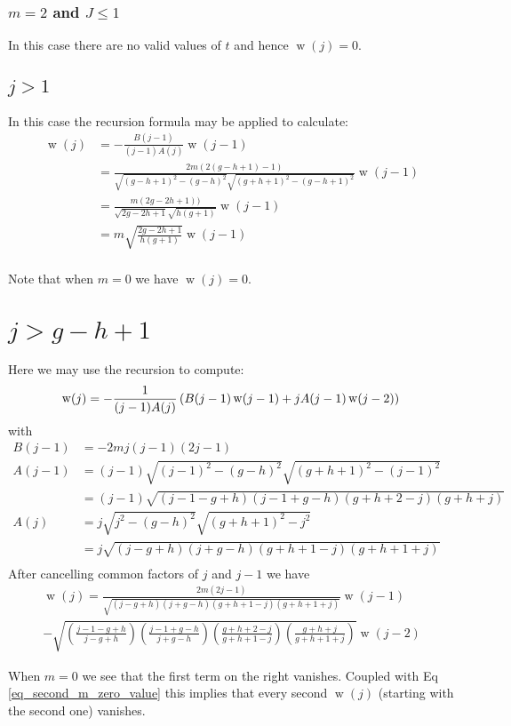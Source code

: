 \documentclass[11pt]{article}
\DeclareMathOperator{\threej}{w}
\begin{document}
\subsubsection{$m=2$ and $J \le 1$}

In this case there are no valid values of $t$ and hence $\threej(j) = 0$.

\subsection{$j>1$}

In this case the recursion formula may be applied to calculate:
\begin{equation}
\begin{split}
\threej(j) &= - \frac{B(j-1)}{(j-1)A(j)} \threej(j-1) \\
&= \frac{2m (2(g-h+1)-1)}{\sqrt{(g-h+1)^2-(g-h)^2} \sqrt{(g+h+1)^2-(g-h+1)^2}} \threej(j-1) \\
&= \frac{m (2g-2h+1))}{\sqrt{2g-2h+1} \sqrt{h(g+1)}} \threej(j-1) \\
&= m \sqrt{\frac{2g-2h+1}{h(g+1)}} \threej(j-1) \\
\end{split}
\end{equation}

Note that when $m=0$ we have $\threej(j) = 0$.

\section{$j > g-h+1$}

Here we may use the recursion to compute:
\begin{equation}
\threej(j) = - \frac{1}{(j-1)A(j)} \left(B(j-1)\threej(j-1) + jA(j-1)\threej(j-2) \right) \\
\end{equation}
with
\begin{equation}
\begin{split}
B(j-1) &= -2mj(j-1)(2j-1)  \\
A(j-1) &= (j-1) \sqrt{(j-1)^2 - (g-h)^2} \sqrt{(g+h+1)^2-(j-1)^2} \\
&= (j-1) \sqrt{(j-1-g+h)(j-1+g-h)(g+h+2-j)(g+h+j)} \\
A(j) &= j \sqrt{j^2 - (g-h)^2} \sqrt{(g+h+1)^2-j^2} \\
&= j \sqrt{(j-g+h)(j+g-h)(g+h+1-j)(g+h+1+j)} \\
\end{split}
\end{equation}
After cancelling common factors of $j$ and $j-1$ we have
\begin{multline}
\threej(j) = \frac{2m(2j-1)}{\sqrt{(j-g+h)(j+g-h)(g+h+1-j)(g+h+1+j)}} \threej(j-1) \\
- \sqrt{{\left(\frac{j-1-g+h}{j-g+h} \right)} {\left(\frac{j-1+g-h}{j+g-h} \right)} {\left(\frac{g+h+2-j}{g+h+1-j} \right)} {\left(\frac{g+h+j}{g+h+1+j} \right)}} \threej(j-2)
\end{multline}

When $m=0$ we see that the first term on the right vanishes. Coupled with Eq \ref{eq_second_m_zero_value} this implies that every second $\threej(j)$ (starting with the second one) vanishes.
\end{document}
